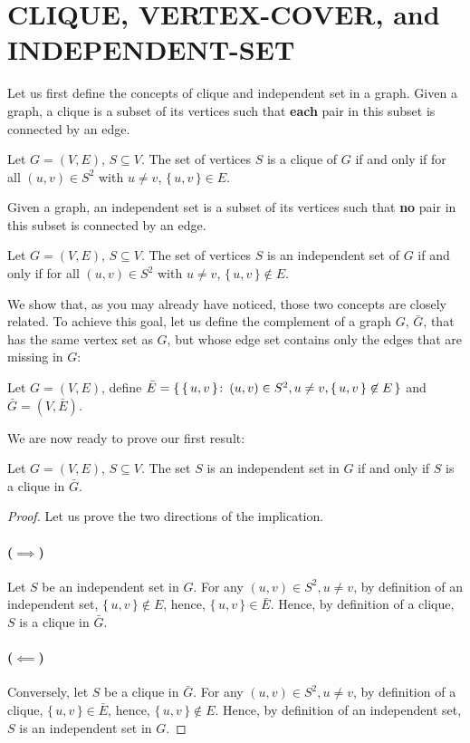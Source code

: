 \section{CLIQUE, VERTEX-COVER, and INDEPENDENT-SET}

Let us first define the concepts of clique and independent set in a graph.
Given a graph, a clique is a subset of its vertices such that \textbf{each} pair in this
subset is connected by an edge.

\begin{definition}[Clique]
  Let $G=(V,E)$, $S\subseteq V$. The set of vertices $S$ is a clique of $G$
  if and only if for all $(u,v) \in S^2$ with $u\ne v$, $\{\,u,v\,\} \in E$.
\end{definition}

Given a graph, an independent set is a subset of its vertices such that
\textbf{no} pair in this
subset is connected by an edge.
\begin{definition}
  Let $G=(V,E)$, $S\subseteq V$. The set of vertices $S$ is an independent set
  of $G$ if and only if for all $(u,v) \in S^2$ with $u\ne v$, $\{\,u,v\,\} \not\in E$.
\end{definition}

We show that, as you may already have noticed, those two concepts are
closely related. To achieve this goal, let us define the complement of a graph
$G$, $\bar{G}$, that has the same vertex set as $G$, but whose edge set
contains only the edges that are missing in $G$:
\begin{definition}
  Let $G = (V,E)$, define $\bar{E}=\{\,\{\,u,v\,\} \colon\, (u,v) \in S^2,
  u \ne v, \{\,u,v\,\} \not\in E\,\}$ and $\bar{G} = (V,\bar{E})$.
\end{definition}

We are now ready to prove our first result:
\begin{theorem}\label{is-cl}
  Let $G = (V,E)$, $S \subseteq V$. The set $S$ is an independent set in $G$ if
  and only if $S$ is a clique in $\bar{G}$.
\end{theorem}

\begin{proof}
  Let us prove the two directions of the implication.
  \paragraph{($\implies$)}%
  Let $S$ be an independent set in $G$.
  For any $(u,v) \in S^2, u \ne v$, by definition of an independent set,
  $\{\,u,v\,\} \not\in E$, hence, $\{\,u,v\,\} \in \bar{E}$. Hence, by
  definition of a clique, $S$ is a clique in $\bar{G}$.

  \paragraph{($\impliedby$)}%
  Conversely, let $S$ be a clique in $\bar{G}$.
  For any $(u,v) \in S^2, u \ne v$, by definition of a clique,
  $\{\,u,v\,\} \in \bar{E}$, hence, $\{\,u,v\,\} \not\in E$. Hence, by
  definition of an independent set, $S$ is an independent set in $G$.
\end{proof}

